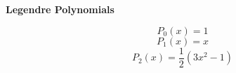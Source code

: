 {\bf Legendre Polynomials}

\begin{equation}
P_0(x) = 1
\end{equation}
\begin{equation}
P_1(x) = x
\end{equation}
\begin{equation}
P_2(x) = \frac{1}{2} (3x^2-1)
\end{equation}
